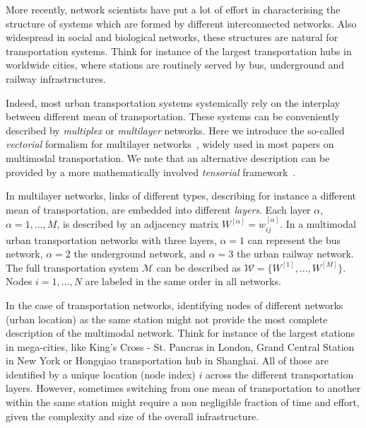 More recently, network scientists have put a lot of effort in characterising the structure of systems which are formed by different interconnected networks. Also widespread in social and biological networks, these structures are natural for transportation systems. Think for instance of the largest transportation hubs in worldwide cities, where stations are routinely served by bus, underground and railway infrastructures.

Indeed, most urban transportation systems systemically rely on the interplay between different mean of transportation. These systems can be conveniently described by \textit{multiplex} or \textit{multilayer} networks. Here we introduce the so-called \textit{vectorial} formalism for multilayer networks~\cite{boccaletti2014structure, battiston2014structural}, widely used in most papers on multimodal transportation. We note that an alternative description can be provided by a more mathematically involved \textit{tensorial} framework~\cite{dedomenico2013mathematical, kivela2014multilayer}.  

In multilayer networks, links of different types, describing for instance a different mean of transportation, are embedded into different \textit{layers}. Each layer $\alpha$, $\alpha = 1, \ldots, M$, is described by an adjacency matrix 
$ W^{[\alpha]} = w_{ij}^{[\alpha]}$. In a multimodal urban transportation networks with three layers, $\alpha=1$ can represent the bus network, $\alpha=2$ the underground network, and $\alpha=3$ the urban railway network. The full transportation system $\mathcal M$ can be described as $\mathcal W = \{W^{[1]}, \ldots,  W^{[M]}\}$. Nodes $i=1, \dots, N$ are labeled in the same order in all networks. 

In the case of transportation networks, identifying nodes of different networks (urban location) as the same station might not provide the most complete description of the multimodal network. Think for instance of the largest stations in mega-cities, like King's Cross - St. Pancras in London, Grand Central Station in New York or Hongqiao transportation hub in Shanghai. All of those are identified by a unique location (node index) $i$ across the different transportation layers. However, sometimes switching from one mean of transportation to another within the same station might require a non negligible fraction of time and effort, given the complexity and size of the overall infrastructure. 

